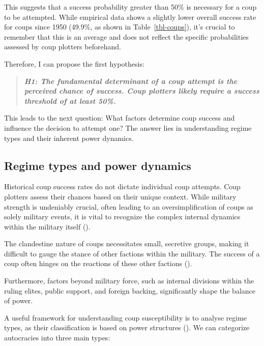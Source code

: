 \documentclass[
  12pt,
]{report}
\begin{document}
This suggests that a success probability greater than 50\% is necessary
for a coup to be attempted. While empirical data shows a slightly lower
overall success rate for coups since 1950 (49.9\%, as shown in
Table~\ref{tbl-coups}), it's crucial to remember that this is an average
and does not reflect the specific probabilities assessed by coup
plotters beforehand.

Therefore, I can propose the first hypothesis:

\begin{quote}
\textbf{\emph{H1: The fundamental determinant of a coup attempt is the
perceived chance of success. Coup plotters likely require a success
threshold of at least 50\%.}}
\end{quote}

This leads to the next question: What factors determine coup success and
influence the decision to attempt one? The answer lies in understanding
regime types and their inherent power dynamics.

\subsection{Regime types and power
dynamics}\label{regime-types-and-power-dynamics}

Historical coup success rates do not dictate individual coup attempts.
Coup plotters assess their chances based on their unique context. While
military strength is undeniably crucial, often leading to an
oversimplification of coups as solely military events, it is vital to
recognize the complex internal dynamics within the military itself
().

The clandestine nature of coups necessitates small, secretive groups,
making it difficult to gauge the stance of other factions within the
military. The success of a coup often hinges on the reactions of these
other factions ().

Furthermore, factors beyond military force, such as internal divisions
within the ruling elites, public support, and foreign backing,
significantly shape the balance of power.

A useful framework for understanding coup susceptibility is to analyse
regime types, as their classification is based on power structures
(). We can
categorize autocracies into three main types:
\end{document}
